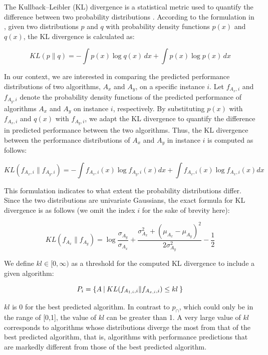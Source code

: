 The Kullback–Leibler (KL) divergence is a statistical metric used to quantify the difference between two probability distributions \cite{KL}. According to the formulation in \cite{bishop2006pattern}, given two distributions $p$ and $q$ with probability density functions $p(x)$ and $q(x)$, the KL divergence is calculated as:

\begin{equation}\label{eq:5.4}
    KL(p \| q) = - \int p(x) \log q(x) \, dx + \int p(x) \log p(x) \, dx
\end{equation}

In our context, we are interested in comparing the predicted performance distributions of two algorithms, $A_{x}$ and $A_{y}$, on a specific instance $i$. Let $f_{A_{x},i}$ and $f_{A_{y},i}$ denote the probability density functions of the predicted performance of algorithms $A_{x}$ and $A_{y}$ on instance $i$, respectively. By substituting $p(x)$ with $f_{A_{x},i}$ and $q(x)$ with $f_{A_{y},i}$, we adapt the KL divergence to quantify the difference in predicted performance between the two algorithms. Thus, the KL divergence between the performance distributions of $A_{x}$ and $A_{y}$ in instance $i$ is computed as follows:

\begin{equation}\label{eq:5.5} KL(f_{A_{x},i} \| f_{A_{y},i}) = - \int f_{A_{x},i}(x) \log f_{A_{y},i}(x) dx + \int f_{A_{x},i}(x) \log f_{A_{x},i}(x) dx \end{equation}

This formulation indicates to what extent the probability distributions differ. Since the two distributions are univariate Gaussians, the exact formula for KL divergence is as follows (we omit the index $i$ for the sake of brevity here):

\begin{equation}\label{eq:5.6}
    KL(f_{A_x} \| f_{A_y}) = \log \frac{\sigma_{A_y}}{\sigma_{A_x}} + \frac{\sigma_{A_x}^2 + (\mu_{A_x} - \mu_{A_y})^2}{2 \sigma_{A_y}^2} - \frac{1}{2}
\end{equation}

We define $kl \in [0, \infty)$ as a threshold for the computed KL divergence to include a given algorithm:

\begin{equation}\label{eq:5.7}
 P_i = \{A \:| \:  KL(f_{A_{1,i},i} \| f_{A_{x,i},i}) \leq \\kl\:\}
\end{equation}

$kl$ is 0 for the best predicted algorithm. In contrast to $p_{\cap}$, which could only be in the range of [0,1], the value of $kl$ can be greater than 1. A very large value of $kl$ corresponds to algorithms whose distributions diverge the most from that of the best predicted algorithm, that is, algorithms with performance predictions that are markedly different from those of the best predicted algorithm.

